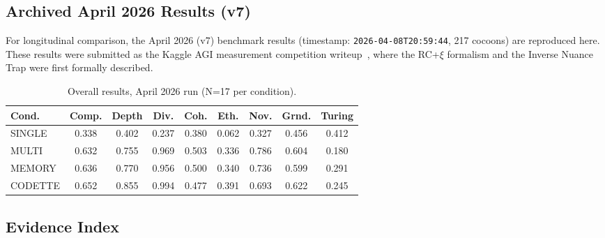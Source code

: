 \documentclass[11pt,a4paper]{article}
\begin{document}
\subsection{Archived April 2026 Results (v7)}
\label{app:v7-results}

For longitudinal comparison, the April 2026 (v7) benchmark results
(timestamp: \texttt{2026-04-08T20:59:44}, 217 cocoons) are reproduced here.
These results were submitted as the Kaggle AGI measurement competition writeup~\citep{harrison2026kaggleagi}, where the RC+$\xi$ formalism and the Inverse Nuance Trap were first formally described.

\begin{table}[ht]
\centering
\caption{Overall results, April 2026 run (N=17 per condition).}
\label{tab:results-v7}
\begin{tabular}{lcccccccc}
\toprule
\textbf{Cond.} & \textbf{Comp.} & \textbf{Depth} & \textbf{Div.} &
  \textbf{Coh.} & \textbf{Eth.} & \textbf{Nov.} & \textbf{Grnd.} &
  \textbf{Turing} \\
\midrule
SINGLE  & 0.338 & 0.402 & 0.237 & 0.380 & 0.062 & 0.327 & 0.456 & 0.412 \\
MULTI   & 0.632 & 0.755 & 0.969 & 0.503 & 0.336 & 0.786 & 0.604 & 0.180 \\
MEMORY  & 0.636 & 0.770 & 0.956 & 0.500 & 0.340 & 0.736 & 0.599 & 0.291 \\
CODETTE & 0.652 & 0.855 & 0.994 & 0.477 & 0.391 & 0.693 & 0.622 & 0.245 \\
\bottomrule
\end{tabular}
\end{table}

\subsection{Evidence Index}
\label{app:evidence-index}
\end{document}
